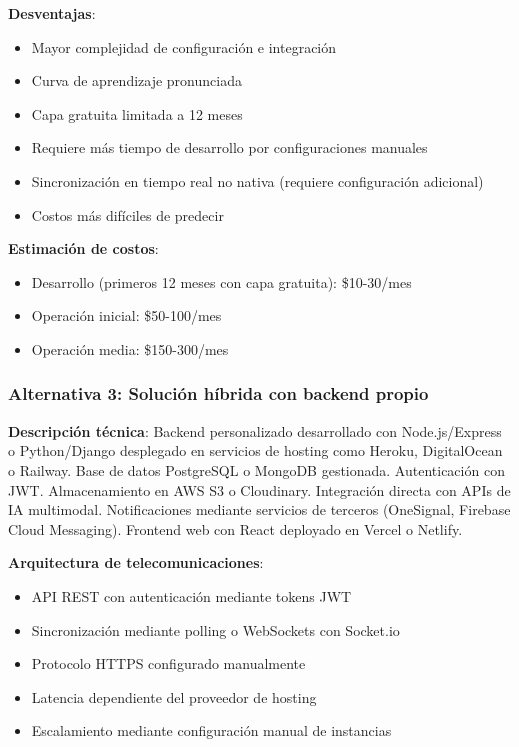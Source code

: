 \textbf{Desventajas}:
\begin{itemize}
    \item Mayor complejidad de configuración e integración
    \item Curva de aprendizaje pronunciada
    \item Capa gratuita limitada a 12 meses
    \item Requiere más tiempo de desarrollo por configuraciones manuales
    \item Sincronización en tiempo real no nativa (requiere configuración adicional)
    \item Costos más difíciles de predecir
\end{itemize}

\textbf{Estimación de costos}:
\begin{itemize}
    \item Desarrollo (primeros 12 meses con capa gratuita): \$10-30/mes
    \item Operación inicial: \$50-100/mes
    \item Operación media: \$150-300/mes
\end{itemize}

\subsubsection{Alternativa 3: Solución híbrida con backend propio}

\textbf{Descripción técnica}: Backend personalizado desarrollado con Node.js/Express o Python/Django desplegado en servicios de hosting como Heroku, DigitalOcean o Railway. Base de datos PostgreSQL o MongoDB gestionada. Autenticación con JWT. Almacenamiento en AWS S3 o Cloudinary. Integración directa con APIs de IA multimodal. Notificaciones mediante servicios de terceros (OneSignal, Firebase Cloud Messaging). Frontend web con React deployado en Vercel o Netlify.

\textbf{Arquitectura de telecomunicaciones}:
\begin{itemize}
    \item API REST con autenticación mediante tokens JWT
    \item Sincronización mediante polling o WebSockets con Socket.io
    \item Protocolo HTTPS configurado manualmente
    \item Latencia dependiente del proveedor de hosting
    \item Escalamiento mediante configuración manual de instancias
\end{itemize}

